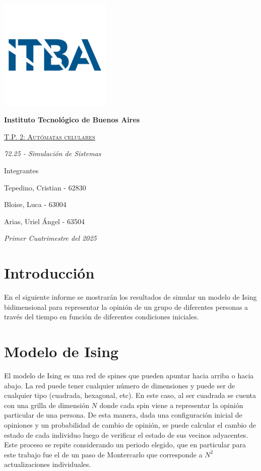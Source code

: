 \documentclass[12pt]{article}
\begin{document}
\begin{titlepage}
\begin{center}

{\includegraphics[width=0.4\textwidth]{itba-1.png}\par}
\vspace{1cm}
{\bfseries\LARGE Instituto Tecnológico de Buenos Aires \par}
\vspace{0.5cm}
{\scshape\Huge\underline {T.P. 2: Autómatas celulares} \par}
\vspace{0.4cm}
{\Large\itshape 72.25 - Simulación de Sistemas  \par}
\end{center}
\vfill

{\Large Integrantes \par}
\centering
{\Large Tepedino, Cristian - 62830 \par}
{\Large Bloise, Luca - 63004 \par}
{\Large Arias, Uriel Ángel - 63504 \par}

\vfill
{\Large\itshape Primer Cuatrimestre del 2025 \par}
\end{titlepage}

\setcounter{page}{0}
\tableofcontents
\clearpage

\section{Introducción}
En el siguiente informe se mostrarán los resultados de simular un modelo de Ising bidimensional para representar la opinión de un grupo de diferentes personas a través del tiempo en función de diferentes condiciones iniciales.

\section{Modelo de Ising}
El modelo de Ising es una red de spines que pueden apuntar hacia arriba o
hacia abajo. La red puede tener cualquier número de dimensiones y puede ser
de cualquier tipo (cuadrada, hexagonal, etc). En este caso, al ser cuadrada se cuenta con una grilla de dimensión $N$ donde cada spin viene a representar la opinión particular de una persona. De esta manera, dada una configuración inicial de opiniones y un probabilidad de cambio de opinión, se puede calcular el cambio de estado de cada individuo luego de verificar el estado de sus vecinos adyacentes. Este proceso se repite considerando un periodo elegido, que en particular para este trabajo fue el de un paso de Montercarlo que corresponde a $N^{2}$ actualizaciones individuales.
\end{document}
